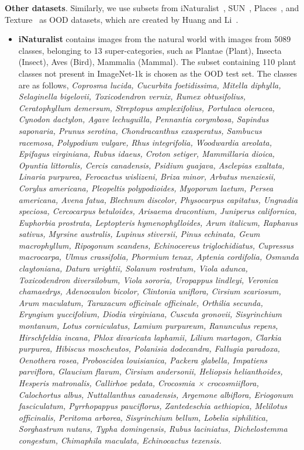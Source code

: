 \noindent
\textbf{Other datasets}. 
Similarly, we use subsets from iNaturalist~\cite{van_horn_inaturalist_2018}, SUN~\cite{xiao_sun_2010}, Places~\cite{zhou_places_2018}, and Texture~\cite{cimpoi_describing_2014} as OOD datasets, which are created by Huang and Li~\cite{huang_mos_2021}. 
\begin{itemize}
    \item 
        \textbf{iNaturalist} contains images from the natural world with images from 5089 classes, belonging to 13 super-categories, such as Plantae (Plant), Insecta (Insect), Aves (Bird), Mammalia (Mammal).
        The subset containing 110 plant classes not present in ImageNet-1k is chosen as the OOD test set. 
        The classes are as follows, \textit{Coprosma lucida, Cucurbita foetidissima, Mitella diphylla, Selaginella bigelovii, Toxicodendron vernix, Rumex obtusifolius, Ceratophyllum demersum, Streptopus amplexifolius, Portulaca oleracea, Cynodon dactylon, Agave lechuguilla, Pennantia corymbosa, Sapindus saponaria, Prunus serotina, Chondracanthus exasperatus, Sambucus racemosa, Polypodium vulgare, Rhus integrifolia, Woodwardia areolata, Epifagus virginiana, Rubus idaeus, Croton setiger, Mammillaria dioica, Opuntia littoralis, Cercis canadensis, Psidium guajava, Asclepias exaltata, Linaria purpurea, Ferocactus wislizeni, Briza minor, Arbutus menziesii, Corylus americana, Pleopeltis polypodioides, Myoporum laetum, Persea americana, Avena fatua, Blechnum discolor, Physocarpus capitatus, Ungnadia speciosa, Cercocarpus betuloides, Arisaema dracontium, Juniperus californica, Euphorbia prostrata, Leptopteris hymenophylloides, Arum italicum, Raphanus sativus, Myrsine australis, Lupinus stiversii, Pinus echinata, Geum macrophyllum, Ripogonum scandens, Echinocereus triglochidiatus, Cupressus macrocarpa, Ulmus crassifolia, Phormium tenax, Aptenia cordifolia, Osmunda claytoniana, Datura wrightii, Solanum rostratum, Viola adunca, Toxicodendron diversilobum, Viola sororia, Uropappus lindleyi, Veronica chamaedrys, Adenocaulon bicolor, Clintonia uniflora, Cirsium scariosum, Arum maculatum, Taraxacum officinale officinale, Orthilia secunda, Eryngium yuccifolium, Diodia virginiana, Cuscuta gronovii, Sisyrinchium montanum, Lotus corniculatus, Lamium purpureum, Ranunculus repens, Hirschfeldia incana, Phlox divaricata laphamii, Lilium martagon, Clarkia purpurea, Hibiscus moscheutos, Polanisia dodecandra, Fallugia paradoxa, Oenothera rosea, Proboscidea louisianica, Packera glabella, Impatiens parviflora, Glaucium flavum, Cirsium andersonii, Heliopsis helianthoides, Hesperis matronalis, Callirhoe pedata, Crocosmia × crocosmiiflora, Calochortus albus, Nuttallanthus canadensis, Argemone albiflora, Eriogonum fasciculatum, Pyrrhopappus pauciflorus, Zantedeschia aethiopica, Melilotus officinalis, Peritoma arborea, Sisyrinchium bellum, Lobelia siphilitica, Sorghastrum nutans, Typha domingensis, Rubus laciniatus, Dichelostemma congestum, Chimaphila maculata, Echinocactus texensis.}

\end{itemize}
